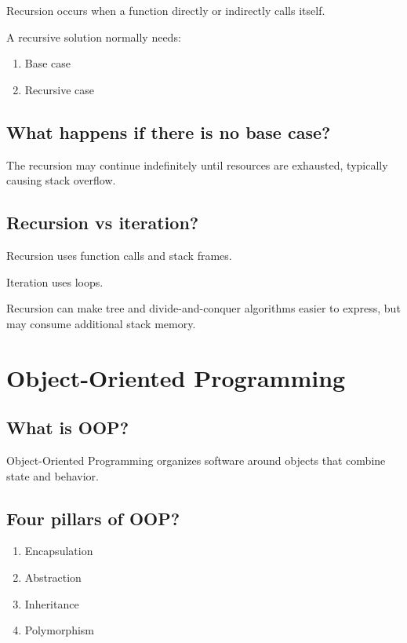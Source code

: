 Recursion occurs when a function directly or indirectly calls itself.

A recursive solution normally needs:

\begin{enumerate}
  \item Base case
  \item Recursive case
\end{enumerate}

\medskip

\subsection{What happens if there is no base case?}

The recursion may continue indefinitely until resources are exhausted, typically causing stack overflow.

\medskip

\subsection{Recursion vs iteration?}

Recursion uses function calls and stack frames.

Iteration uses loops.

Recursion can make tree and divide-and-conquer algorithms easier to express, but may consume additional stack memory.

\medskip

\section{Object-Oriented Programming}

\subsection{What is OOP?}

Object-Oriented Programming organizes software around objects that combine state and behavior.

\medskip

\subsection{Four pillars of OOP?}

\begin{enumerate}
  \item Encapsulation
  \item Abstraction
  \item Inheritance
  \item Polymorphism
\end{enumerate}

